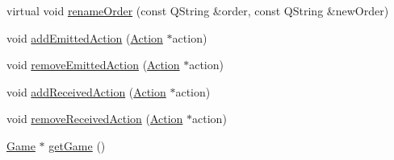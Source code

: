 \begin{DoxyCompactItemize}
\item 
virtual void \hyperlink{class_game_object_ae79a0420e8f2593a507b6fc36afd8b22}{rename\-Order} (const \-Q\-String \&order, const \-Q\-String \&new\-Order)
\item 
void \hyperlink{class_game_object_a011cc4f0da88d20b6db7f1d7863a8ca3}{add\-Emitted\-Action} (\hyperlink{class_action}{\-Action} $\ast$action)
\item 
void \hyperlink{class_game_object_a13ddfb70507b63b9e04bc21d3a8f61e9}{remove\-Emitted\-Action} (\hyperlink{class_action}{\-Action} $\ast$action)
\item 
void \hyperlink{class_game_object_a9083fcf5ac7234a11a65bab3ae7c8c49}{add\-Received\-Action} (\hyperlink{class_action}{\-Action} $\ast$action)
\item 
void \hyperlink{class_game_object_ab5bec8aa4f6c02c3d6f88815a021d1e6}{remove\-Received\-Action} (\hyperlink{class_action}{\-Action} $\ast$action)
\item 
\hyperlink{class_game}{\-Game} $\ast$ \hyperlink{class_game_object_acc435f47c458df5e3b85940cf78a7a17}{get\-Game} ()
\end{DoxyCompactItemize}
